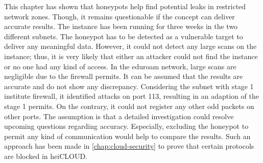 This chapter has shown that honeypots help find potential leaks in restricted network zones.
Though, it remains questionable if the concept can deliver accurate results.
The instance has been running for three weeks in the two different subnets.
The honeypot has to be detected as a vulnerable target to deliver any meaningful data.
However, it could not detect any large scans on the instance; thus, it is very likely that either an attacker could not find the instance or no one had any kind of access.
In the eduroam network, large scans are negligible due to the firewall permits.
It can be assumed that the results are accurate and do not show any discrepancy.
Considering the subnet with stage 1 institute firewall, it identified attacks on port 113, resulting in an adaption of the stage 1 permits.
On the contrary, it could not register any other odd packets on other ports.
The assumption is that a detailed investigation could resolve upcoming questions regarding accuracy.
Especially, excluding the honeypot to permit any kind of communication would help to compare the results.
Such an approach has been made in \autoref{chap:cloud-security} to prove that certain protocols are blocked in heiCLOUD.
